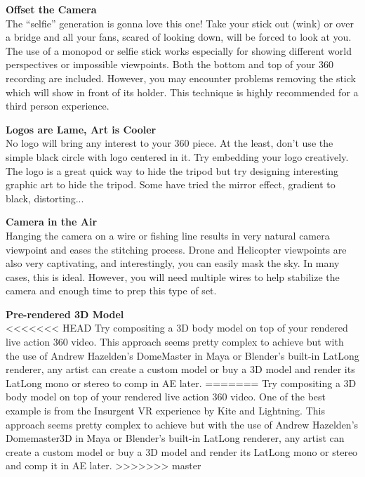 \begin{fullwidth}

{\bfseries Offset the Camera}
\\
The “selfie” generation is gonna love this one! Take your stick out (wink) or over a bridge and all your fans, scared of looking down, will be forced to look at you. The use of a monopod or selfie stick works especially for showing different world perspectives or impossible viewpoints. Both the bottom and top of your 360 recording are included. However, you may encounter problems removing the stick which will show in front of its holder. This technique is highly recommended for a third person experience.


{\bfseries Logos are Lame, Art is Cooler}
\\
No logo will bring any interest to your 360 piece. At the least, don’t use the simple black circle with logo centered in it. Try embedding your logo creatively. The logo is a great quick way to hide the tripod but try designing interesting graphic art to hide the tripod. Some have tried the mirror effect, gradient to black, distorting... 

\clearpage
{\bfseries Camera in the Air}
\\
Hanging the camera on a wire or fishing line results in very natural camera viewpoint and eases the stitching process. Drone and Helicopter viewpoints are also very captivating, and interestingly, you can easily mask the sky. In many cases, this is ideal. However, you will need multiple wires to help stabilize the camera and enough time to prep this type of set.


{\bfseries Pre-rendered 3D Model}
\\
<<<<<<< HEAD
Try compositing a 3D body model on top of your rendered live action 360 video. This approach seems pretty complex to achieve but with the use of Andrew Hazelden's DomeMaster in Maya or Blender's built-in LatLong renderer, any artist can create a custom model or buy a 3D model and render its LatLong mono or stereo to comp in AE later. 
=======
Try compositing a 3D body model on top of your rendered live action 360 video. One of the best example is from the Insurgent VR experience by Kite and Lightning. This approach seems pretty complex to achieve but with the use of Andrew Hazelden's Domemaster3D in Maya or Blender's built-in LatLong renderer, any artist can create a custom model or buy a 3D model and render its LatLong mono or stereo and comp it in AE later.
>>>>>>> master


\end{fullwidth}
